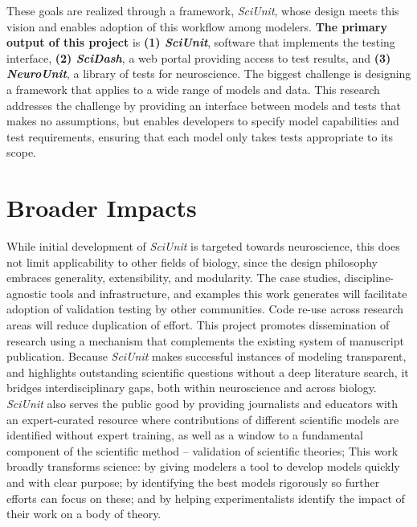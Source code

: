 \documentclass[11pt,letterpaper]{article}
\begin{document}
These goals are realized through a framework, \textit{SciUnit}, whose design meets this vision and enables adoption of this workflow among modelers. 
\textbf{The primary output of this project} is \textbf{(1) \textit{SciUnit}}, software that implements the testing interface, \textbf{(2) \textit{SciDash}}, a web portal providing access to test results, and \textbf{(3) \textit{NeuroUnit}}, a library of tests for neuroscience.  
The biggest challenge is designing a framework that applies to a wide range of models and data.  
This research addresses the challenge by providing an interface between models and tests that makes no assumptions, but enables developers to specify model capabilities and test requirements, ensuring that each model only takes tests appropriate to its scope.  

\section{Broader Impacts}
While initial development of \textit{SciUnit} is targeted towards neuroscience, this does not limit applicability to other fields of biology, since the design philosophy embraces generality, extensibility, and modularity. 
The case studies, discipline-agnostic tools and infrastructure, and examples this work generates will facilitate adoption of validation testing by other communities.  
Code re-use across research areas will reduce duplication of effort.  
This project promotes dissemination of research using a mechanism that complements the existing system of manuscript publication.  
Because \textit{SciUnit} makes successful instances of modeling transparent, and highlights outstanding scientific questions without a deep literature search, it bridges interdisciplinary gaps, both within neuroscience and across biology. 
\textit{SciUnit} also serves the public good by providing journalists and educators with an expert-curated resource where contributions of different scientific models are identified without expert training, as well as a window to a fundamental component of the scientific method – validation of scientific theories;
This work broadly transforms science: by giving modelers a tool to develop models quickly and with clear purpose; 
by identifying the best models rigorously so further efforts can focus on these; and by helping experimentalists identify the impact of their work on a body of theory.
\end{document}
